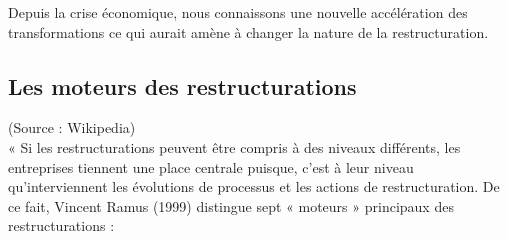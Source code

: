 \documentclass[12pt,a4paper]{article}
\begin{document}
Depuis la crise économique, nous connaissons une nouvelle accélération des transformations ce qui aurait amène à changer la nature de la restructuration.

\subsection{Les moteurs des restructurations}

(Source : Wikipedia)\\ 

« Si les restructurations peuvent être compris à des niveaux différents, les entreprises tiennent une place centrale puisque, c’est à leur niveau qu'interviennent les évolutions de processus et les actions de restructuration. De ce fait, Vincent Ramus (1999) distingue sept « moteurs » principaux des restructurations : 
\end{document}
